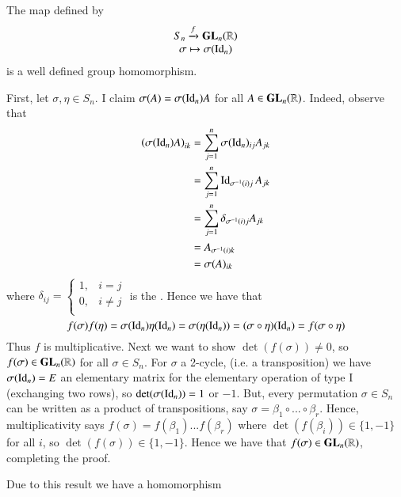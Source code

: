 \documentclass[12pt, a4paper, twoside, openright, titlepage]{book}
\begin{document}
\begin{claim}{}{}
        The map defined by \begin{equation}
                \begin{array}{c} S_n\xrightarrow{f}\mathbf{GL}_n(\mathbb R) \\ \sigma \mapsto \sigma(\operatorname{Id}_n) \end{array}
        \end{equation}
        is a well defined group homomorphism.
\end{claim}
\begin{proof*}{}{}
        First, let $\sigma, \eta \in S_n$. I claim $\sigma(A) = \sigma(\operatorname{Id}_n)A$ for all $A \in \mathbf{GL}_n(\mathbb R)$. Indeed, observe that \begin{align*}
                \left(\sigma(\operatorname{Id}_n)A\right)_{ik} &= \sum\limits_{j=1}^n\sigma(\operatorname{Id}_n)_{ij}A_{jk} \\
                &= \sum\limits_{j=1}^n\operatorname{Id}_{\sigma^{-1}(i)j}A_{jk} \\
                &= \sum\limits_{j=1}^n\delta_{\sigma^{-1}(i)j}A_{jk} \\
                &= A_{\sigma^{-1}(i)k} \\
                &= \sigma(A)_{ik}
        \end{align*}
        where $\delta_{ij} = \left\{\begin{array}{ll} 1, & i = j \\ 0, & i \neq j \\ \end{array}\right.$ is the . Hence we have that \begin{equation}
                f(\sigma)f(\eta) = \sigma(\operatorname{Id}_n)\eta(\operatorname{Id}_n) = \sigma(\eta(\operatorname{Id}_n)) = (\sigma \circ \eta)(\operatorname{Id}_n) = f(\sigma \circ \eta)
        \end{equation}
        Thus $f$ is multiplicative. Next we want to show $\det(f(\sigma)) \neq 0$, so $f(\sigma) \in \mathbf{GL}_n(\mathbb R)$ for all $\sigma \in S_n$. For $\sigma$ a 2-cycle, (i.e. a transposition) we have $\sigma(\operatorname{Id}_n) = E$ an elementary matrix for the elementary operation of type I (exchanging two rows), so $\det(\sigma(\operatorname{Id}_n)) = 1$ or $-1$. But, every permutation $\sigma \in S_n$ can be written as a product of transpositions, say $\sigma = \beta_1 \circ ...\circ \beta_r$. Hence, multiplicativity says $f(\sigma) = f(\beta_1)...f(\beta_r)$ where $\det(f(\beta_i)) \in \{1,-1\}$ for all $i$, so $\det(f(\sigma)) \in \{1,-1\}$. Hence we have that $f(\sigma) \in \mathbf{GL}_n(\mathbb R)$, completing the proof.
\end{proof*}


\begin{cor}{}{}
        Due to this result we have a homomorphism
        \begin{center}
        \end{center}
\end{cor}
\end{document}
